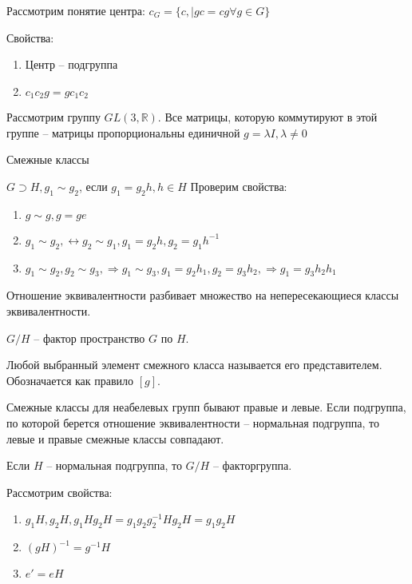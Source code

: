 \documentclass[10pt,a4paper]{article}
\begin{document}
		Рассмотрим понятие центра: $c_{G} = \lbrace c, | gc = cg \forall g \in G\rbrace$
		
		Свойства: 
		\begin{enumerate}
			\item Центр -- подгруппа
			\item $c_{1}c_{2}g = gc_{1}c_{2}$
		\end{enumerate}
		
		Рассмотрим группу $GL\left(3, \mathbb{R}\right)$. Все матрицы, которую коммутируют в этой группе -- матрицы пропорциональны единичной $g = \lambda I, \lambda \neq 0$
		
		Смежные классы
		
		$G \supset H, g_{1} \sim g_{2}$, если $g_{1} = g_{2}h, h \in H$
		Проверим свойства: 
		\begin{enumerate}
			\item $g\sim g, g = ge$
			\item $g_{1} \sim g_{2}, \leftrightarrow g_{2} \sim g_{1}, g_{1} = g_{2}h, g_{2} = g_{1}h^{-1}$
			\item $g_{1} \sim g_{2}, g_{2} \sim g_{3}, \Rightarrow g_{1}\sim g_{3}, g_{1} = g_{2}h_{1}, g_{2} = g_{3}h_{2}, \Rightarrow g_{1} = g_{3}h_{2}h_{1}$
		\end{enumerate}
		
		Отношение эквивалентности разбивает множество на непересекающиеся классы эквивалентности. 
		
		$G\slash H $ -- фактор пространство $G$ по $H$.
		
		Любой выбранный элемент смежного класса называется его представителем. Обозначается как правило $\left[g\right]$.
		
		
		Смежные классы для неабелевых групп бывают правые и левые. Если подгруппа, по которой берется отношение эквивалентности -- нормальная подгруппа, то левые и правые смежные классы совпадают.
		
		Если $H$ -- нормальная подгруппа, то $G\slash H$ -- факторгруппа.
		
		
		
		Рассмотрим свойства:
		
		\begin{enumerate}
			\item $g_{1}H, g_{2}H, g_{1}Hg_{2}H = g_{1}g_{2}g_{2}^{-1}Hg_{2}H = g_{1}g_{2}H$
			\item $\left(gH\right)^{-1} = g^{-1}H$
			\item $e' = eH$
		\end{enumerate}
		
\end{document}
